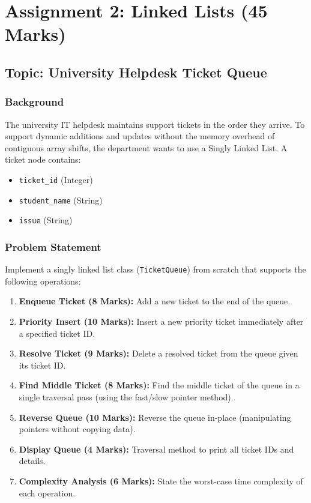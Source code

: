 \documentclass[11pt,a4paper]{article}
\begin{document}
\newpage

\section{Assignment 2: Linked Lists (45 Marks)}
\subsection*{Topic: University Helpdesk Ticket Queue}

\subsubsection*{Background}
The university IT helpdesk maintains support tickets in the order they arrive. To support dynamic additions and updates without the memory overhead of contiguous array shifts, the department wants to use a Singly Linked List. A ticket node contains:
\begin{itemize}
    \item \texttt{ticket\_id} (Integer)
    \item \texttt{student\_name} (String)
    \item \texttt{issue} (String)
\end{itemize}

\subsubsection*{Problem Statement}
Implement a singly linked list class (\texttt{TicketQueue}) from scratch that supports the following operations:
\begin{enumerate}
    \item \textbf{Enqueue Ticket (8 Marks):} Add a new ticket to the end of the queue.
    \item \textbf{Priority Insert (10 Marks):} Insert a new priority ticket immediately after a specified ticket ID.
    \item \textbf{Resolve Ticket (9 Marks):} Delete a resolved ticket from the queue given its ticket ID.
    \item \textbf{Find Middle Ticket (8 Marks):} Find the middle ticket of the queue in a single traversal pass (using the fast/slow pointer method).
    \item \textbf{Reverse Queue (10 Marks):} Reverse the queue in-place (manipulating pointers without copying data).
    \item \textbf{Display Queue (4 Marks):} Traversal method to print all ticket IDs and details.
    \item \textbf{Complexity Analysis (6 Marks):} State the worst-case time complexity of each operation.
\end{enumerate}
\end{document}
